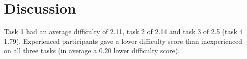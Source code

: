 \chapter{Discussion}

Task 1 had an average difficulty of 2.11, task 2 of 2.14 and task 3 of 2.5 (task 4 1.79). Experienced participants gave a lower difficulty score than inexperienced on all three tasks (in average a 0.20 lower difficulty score).